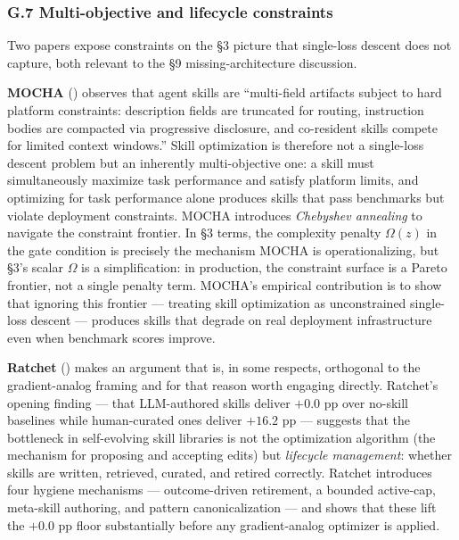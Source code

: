 \documentclass[
]{article}
\begin{document}
\subsubsection{G.7 Multi-objective and lifecycle
constraints}\label{g.7-multi-objective-and-lifecycle-constraints}

Two papers expose constraints on the §3 picture that single-loss descent
does not capture, both relevant to the §9 missing-architecture
discussion.

\textbf{MOCHA} ()
observes that agent skills are ``multi-field artifacts subject to hard
platform constraints: description fields are truncated for routing,
instruction bodies are compacted via progressive disclosure, and
co-resident skills compete for limited context windows.'' Skill
optimization is therefore not a single-loss descent problem but an
inherently multi-objective one: a skill must simultaneously maximize
task performance and satisfy platform limits, and optimizing for task
performance alone produces skills that pass benchmarks but violate
deployment constraints. MOCHA introduces \emph{Chebyshev annealing} to
navigate the constraint frontier. In §3 terms, the complexity penalty
\(\Omega(z)\) in the gate condition is precisely the mechanism MOCHA is
operationalizing, but §3's scalar \(\Omega\) is a simplification: in
production, the constraint surface is a Pareto frontier, not a single
penalty term. MOCHA's empirical contribution is to show that ignoring
this frontier --- treating skill optimization as unconstrained
single-loss descent --- produces skills that degrade on real deployment
infrastructure even when benchmark scores improve.

\textbf{Ratchet} ()
makes an argument that is, in some respects, orthogonal to the
gradient-analog framing and for that reason worth engaging directly.
Ratchet's opening finding --- that LLM-authored skills deliver \(+0.0\)
pp over no-skill baselines while human-curated ones deliver \(+16.2\) pp
--- suggests that the bottleneck in self-evolving skill libraries is not
the optimization algorithm (the mechanism for proposing and accepting
edits) but \emph{lifecycle management}: whether skills are written,
retrieved, curated, and retired correctly. Ratchet introduces four
hygiene mechanisms --- outcome-driven retirement, a bounded active-cap,
meta-skill authoring, and pattern canonicalization --- and shows that
these lift the \(+0.0\) pp floor substantially before any
gradient-analog optimizer is applied.
\end{document}
